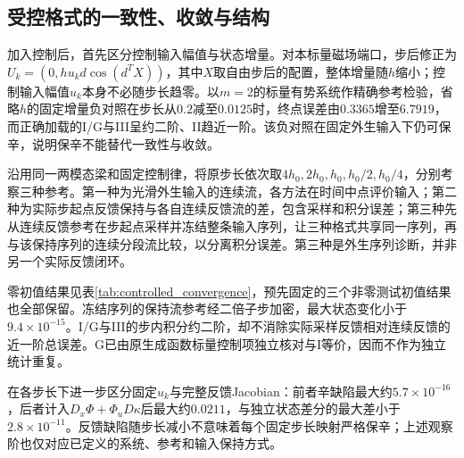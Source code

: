 \subsection{受控格式的一致性、收敛与结构}
\label{sec:controlled_convergence}

加入控制后，首先区分控制输入幅值与状态增量。对本标量磁场端口，步后修正为$U_k=(0,h u_kd\cos(d^TX))$，其中$X$取自由步后的配置，整体增量随$h$缩小；控制输入幅值$u_k$本身不必随步长趋零。以$m=2$的标量有势系统作精确参考检验，省略$h$的固定增量负对照在步长从$0.2$减至$0.0125$时，终点误差由$0.3365$增至$6.7919$，而正确加载的I/G与III呈约二阶、II趋近一阶。该负对照在固定外生输入下仍可保辛，说明保辛不能替代一致性与收敛。

沿用同一两模态梁和固定控制律，将原步长依次取$4h_0,2h_0,h_0,h_0/2,h_0/4$，分别考察三种参考。第一种为光滑外生输入的连续流，各方法在时间中点评价输入；第二种为实际步起点反馈保持与各自连续反馈流的差，包含采样和积分误差；第三种先从连续反馈参考在步起点采样并冻结整条输入序列，让三种格式共享同一序列，再与该保持序列的连续分段流比较，以分离积分误差。第三种是外生序列诊断，并非另一个实际反馈闭环。



零初值结果见表\ref{tab:controlled_convergence}，预先固定的三个非零测试初值结果也全部保留。冻结序列的保持流参考经二倍子步加密，最大状态变化小于$9.4\times10^{-15}$。I/G与III的步内积分约二阶，却不消除实际采样反馈相对连续反馈的近一阶总误差。G已由原生成函数标量控制项独立核对与I等价，因而不作为独立统计重复。

在各步长下进一步区分固定$u_k$与完整反馈Jacobian：前者辛缺陷最大约$5.7\times10^{-16}$，后者计入$D_x\Phi+\Phi_uD\kappa$后最大约$0.0211$，与独立状态差分的最大差小于$2.8\times10^{-11}$。反馈缺陷随步长减小不意味着每个固定步长映射严格保辛；上述观察阶也仅对应已定义的系统、参考和输入保持方式。
